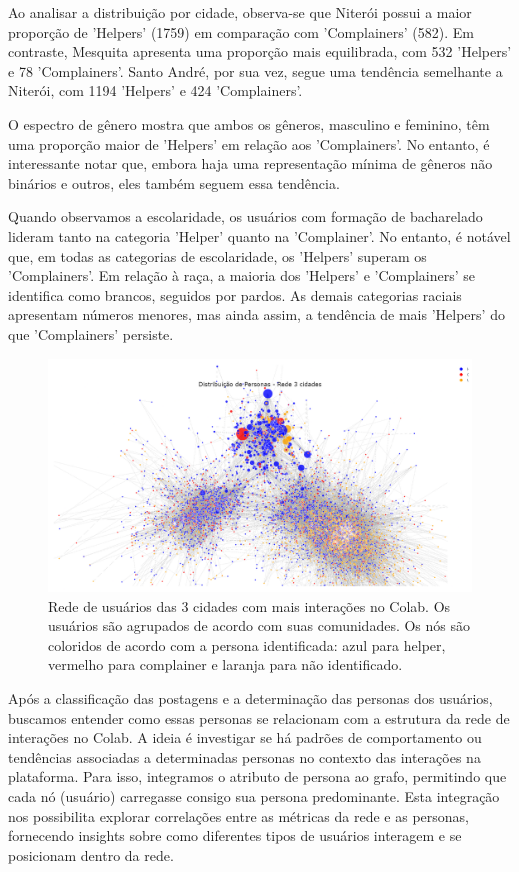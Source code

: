 Ao analisar a distribuição por cidade, observa-se que Niterói possui a maior proporção de 'Helpers' (1759) em comparação com 'Complainers' (582). Em contraste, Mesquita apresenta uma proporção mais equilibrada, com 532 'Helpers' e 78 'Complainers'. Santo André, por sua vez, segue uma tendência semelhante a Niterói, com 1194 'Helpers' e 424 'Complainers'. 

O espectro de gênero mostra que ambos os gêneros, masculino e feminino, têm uma proporção maior de 'Helpers' em relação aos 'Complainers'. No entanto, é interessante notar que, embora haja uma representação mínima de gêneros não binários e outros, eles também seguem essa tendência. 

Quando observamos a escolaridade, os usuários com formação de bacharelado lideram tanto na categoria 'Helper' quanto na 'Complainer'. No entanto, é notável que, em todas as categorias de escolaridade, os 'Helpers' superam os 'Complainers'. Em relação à raça, a maioria dos 'Helpers' e 'Complainers' se identifica como brancos, seguidos por pardos. As demais categorias raciais apresentam números menores, mas ainda assim, a tendência de mais 'Helpers' do que 'Complainers' persiste.

\begin{figure}[h]
    \centering
    \includegraphics[width=1\textwidth]{images/personas_network.png} 
    \caption{Rede de usuários das 3 cidades com mais interações no Colab. Os usuários são agrupados de acordo com suas comunidades. Os nós são coloridos de acordo com a persona identificada: azul para helper, vermelho para complainer e laranja para não identificado.}
    \label{fig:personas_network}
\end{figure}

Após a classificação das postagens e a determinação das personas dos usuários, buscamos entender como essas personas se relacionam com a estrutura da rede de interações no Colab. A ideia é investigar se há padrões de comportamento ou tendências associadas a determinadas personas no contexto das interações na plataforma. Para isso, integramos o atributo de persona ao grafo, permitindo que cada nó (usuário) carregasse consigo sua persona predominante. Esta integração nos possibilita explorar correlações entre as métricas da rede e as personas, fornecendo insights sobre como diferentes tipos de usuários interagem e se posicionam dentro da rede.

